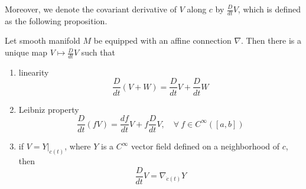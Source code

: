 Moreover, we denote the covariant derivative of $V$ along $c$ by $\frac{D}{dt}V$, which is defined as the following proposition.
\begin{prop}
	Let smooth manifold $M$ be equipped with an affine connection $\nabla$. Then there is a unique map $V \mapsto \frac{D}{dt}V$ such that
	\begin{enumerate}[label=(\arabic{*})]
		\item linearity
		\begin{equation*}
			\frac{D}{dt}(V+W) = \frac{D}{dt}V +\frac{D}{dt}W
		\end{equation*}
		\item Leibniz property
		\begin{equation*}
			\frac{D}{dt}(fV) = \frac{df}{dt}V+ f\frac{D}{dt}V,\quad \forall~f \in C^\infty([a,b])
		\end{equation*}
		\item if $V = Y|_{c(t)}$, where $Y$ is a $C^\infty$ vector field defined on a neighborhood of $c$, then
		\begin{equation*}
			\frac{D}{dt}V = \nabla_{\dot{c}(t)}Y
		\end{equation*}
	\end{enumerate}
\end{prop}
